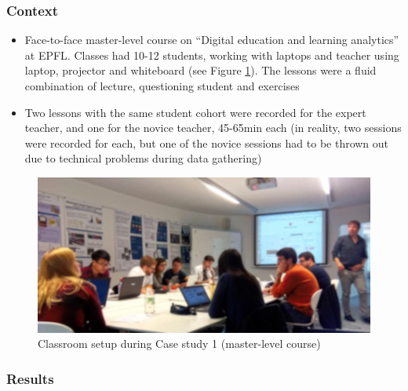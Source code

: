 \documentclass[10pt,journal,compsoc]{IEEEtran}
\begin{document}
\subsubsection{Context}

\begin{itemize}
\item Face-to-face master-level course on ``Digital education and learning analytics'' at EPFL. Classes had 10-12 students, working with laptops and teacher using laptop, projector and whiteboard (see Figure \ref{fig:case1picture}). The lessons were a fluid combination of lecture, questioning student and exercises
\item Two lessons with the same student cohort were recorded for the expert teacher, and one for the novice teacher, 45-65min each (in reality, two sessions were recorded for each, but one of the novice sessions had to be thrown out due to technical problems during data gathering)
\end{itemize}


\begin{figure}[!t]
\centering
\includegraphics[width=\linewidth]{img/Case1Picture}
\caption{Classroom setup during Case study 1 (master-level course)}
\label{fig:case1picture}
\end{figure}

\subsubsection{Results}
\end{document}

